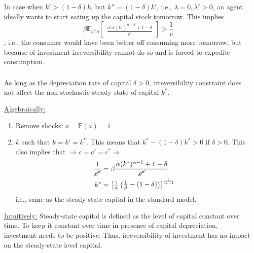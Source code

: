 \documentclass[]{article}
\begin{document}
In case when $k' > (1 - \delta)k$, but $k'' = (1 - \delta)k'$, i.e., $\lambda = 0, \lambda' > 0$, an agent ideally wants to start eating up the capital stock tomorrow. This implies
\begin{equation}
	\beta\mathbb{E}_{a'|a}\begin{bmatrix}\frac{a'\alpha(k')^{\alpha - 1} + 1 - \delta}{c'}\end{bmatrix} > \frac{1}{c} \nonumber
\end{equation}
, i.e., the consumer would have been better off consuming more tomorrow, but because of investment irreversibility cannot do so and is forced to expedite consumption.

\subsubsection{}
As long as the depreciation rate of capital $\delta > 0$, irreversibility constraint does not affect the non-stochastic steady-state of capital $k^*$.

\underline{Algebraically:}
\begin{enumerate}
	\item Remove shocks: $a = \mathbb{E}(a) = 1$
	\item $k$ such that $k = k' = k^*$. This means that $k^* - (1 - \delta)k^* > 0$ if $\delta > 0$. This also implies that $\Rightarrow c = c' = c^* \Longrightarrow$
	\begin{equation}
		\begin{split}
			\frac{1}{\cancel{c^*}}& = \beta\frac{\alpha(k^*)^{\alpha - 1} + 1 - \delta}{\cancel{c^*}} \nonumber \\
			k^*& = \begin{bmatrix}\frac{1}{\alpha}\begin{pmatrix}\frac{1}{\beta} - (1 - \delta)\end{pmatrix}\end{bmatrix}^{\frac{1}{\alpha - 1}}
		\end{split}
	\end{equation}
	i.e., same as the steady-state capital in the standard model.
\end{enumerate}

\underline{Intuitively:}
Steady-state capital is defined as the level of capital constant over time. To keep it constant over time in presence of capital depreciation, investment needs to be positive. Thus, irreversibility of investment has no impact on the steady-state level capital.
\end{document}
